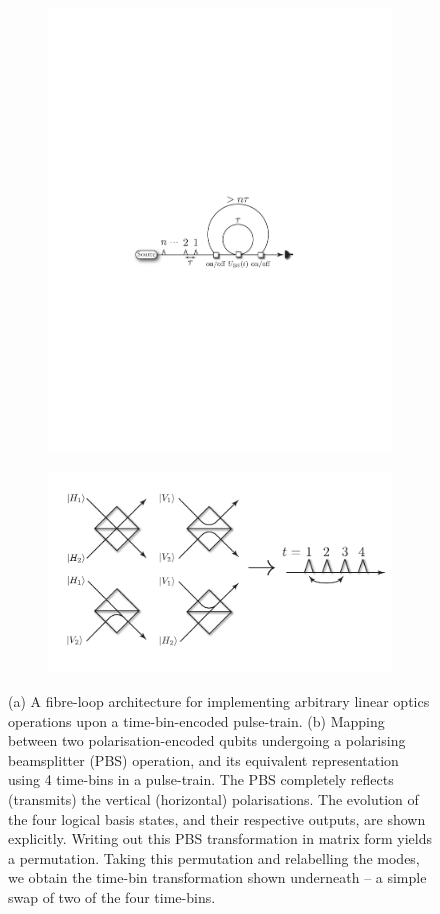 \documentclass[times,final]{elsarticle}
\begin{document}
\begin{figure}
\centering
\begin{subfigure}{.5\columnwidth}
  \centering
  \includegraphics[width=0.7\columnwidth]{full_architecture}
  \caption{}
  \label{fig:FL_arch}
\end{subfigure}%
\begin{subfigure}{0.5\columnwidth}
  \centering
  \includegraphics[width=0.8\columnwidth]{PBS_TB}
  \caption{}
  \label{fig:PBS_TB}
\end{subfigure}
\caption{(a) A fibre-loop architecture for implementing arbitrary linear optics operations upon a time-bin-encoded pulse-train. (b) Mapping between two polarisation-encoded qubits undergoing a polarising beamsplitter (PBS) operation, and its equivalent representation using 4 time-bins in a pulse-train. The PBS completely reflects (transmits) the vertical (horizontal) polarisations. The evolution of the four logical basis states, and their respective outputs, are shown explicitly. Writing out this PBS transformation in matrix form yields a permutation. Taking this permutation and relabelling the modes, we obtain the time-bin transformation shown underneath -- a simple swap of two of the four time-bins.}
\end{figure}
\end{document}
